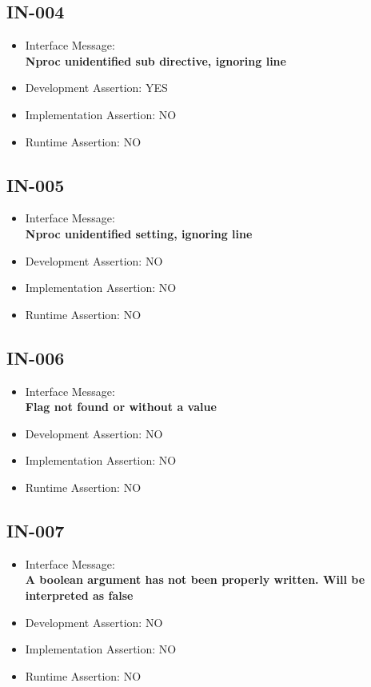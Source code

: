 \subsection{IN-004}
\begin{itemize}
  \item Interface Message:\\[1em]\textbf{Nproc unidentified sub directive, ignoring line}
  \item Development Assertion: YES
  \item Implementation Assertion: NO
  \item Runtime Assertion: NO
\end{itemize}

\subsection{IN-005}
\begin{itemize}
  \item Interface Message:\\[1em]\textbf{Nproc unidentified setting, ignoring line}
  \item Development Assertion: NO
  \item Implementation Assertion: NO
  \item Runtime Assertion: NO
\end{itemize}

\subsection{IN-006}
\begin{itemize}
  \item Interface Message:\\[1em]\textbf{Flag not found or without a value}
  \item Development Assertion: NO
  \item Implementation Assertion: NO
  \item Runtime Assertion: NO
\end{itemize}

\subsection{IN-007}
\begin{itemize}
  \item Interface Message:\\[1em]\textbf{A boolean argument has not been properly written. Will be interpreted as false}
  \item Development Assertion: NO
  \item Implementation Assertion: NO
  \item Runtime Assertion: NO
\end{itemize}

